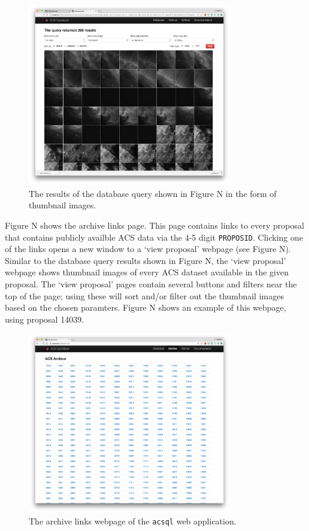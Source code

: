 \documentclass[10pt,journal,compsoc]{IEEEtran}
\begin{document}
\begin{figure}[!t]
\centering
\includegraphics[width=3.5in]{./figures/database_query_results_thumbnails.png}
\caption{The results of the database query shown in Figure N in the form of thumbnail
images.}
\label{fig1}
\end{figure}

Figure N shows the archive links page.  This page contains links to every proposal that contains
publicly availble ACS data via the 4-5 digit \texttt{PROPOSID}.  Clicking one of the links
opens a new window to a `view proposal' webpage (see Figure N).  Similar to the database query
results shown in Figure N, the `view proposal' webpage shows thumbnail images of every ACS
dataset available in the given proposal.  The `view proposal' pages contain several buttons and
filters near the top of the page; using these will sort and/or filter out the thumbnail images
based on the chosen paramters.  Figure N shows an example of this webpage, using proposal 14039.

\begin{figure}[!t]
\centering
\includegraphics[width=3.5in]{./figures/archive_links.png}
\caption{The archive links webpage of the \texttt{acsql} web application.}
\label{fig1}
\end{figure}
\end{document}
